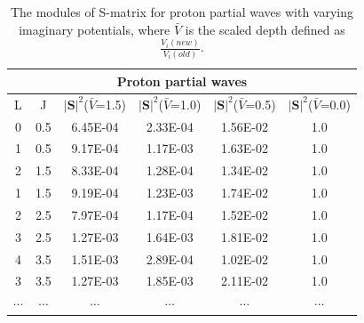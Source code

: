 \documentclass[12pt]{article}
\begin{document}
	\begin{table}[]
\centering
\begin{tabular}{cccccc}
\toprule
\toprule
\multicolumn{6}{c}{Proton partial waves}                                                                         \\
 \midrule
L                     & J                     & $|\mathbf{S}|^2$($\bar{V}$=1.5) & $|\mathbf{S}|^2$($\bar{V}$=1.0) & $|\mathbf{S}|^2$($\bar{V}$=0.5) & $|\mathbf{S}|^2$($\bar{V}$=0.0) \\
0                     & 0.5                   & 6.45E-04                     & 2.33E-04                     & 1.56E-02                     & 1.0                          \\
1                     & 0.5                   & 9.17E-04                     & 1.17E-03                     & 1.63E-02                     & 1.0                          \\
2                     & 1.5                   & 8.33E-04                     & 1.28E-04                     & 1.34E-02                     & 1.0                          \\
1                     & 1.5                   & 9.19E-04                     & 1.23E-03                     & 1.74E-02                     & 1.0                          \\
2                     & 2.5                   & 7.97E-04                     & 1.17E-04                     & 1.52E-02                     & 1.0                          \\
3                     & 2.5                   & 1.27E-03                     & 1.64E-03                     & 1.81E-02                     & 1.0                          \\
4                     & 3.5                   & 1.51E-03                     & 2.89E-04                     & 1.02E-02                     & 1.0                          \\
3                     & 3.5                   & 1.27E-03                     & 1.85E-03                     & 2.11E-02     
	& 1.0                          \\
   
$\cdots$           &$\cdots$                    & $\cdots$                            & $\cdots$                           & $\cdots$                           & $\cdots$                                                                \\
\bottomrule
\bottomrule
\end{tabular}
\caption{The modules of S-matrix for proton partial waves with varying imaginary potentials, where $\bar{V}$ is the scaled depth defined as $\frac{V_i(new)}{V_i(old)}$.}
\label{pSmatrix}
\end{table}
\end{document}
